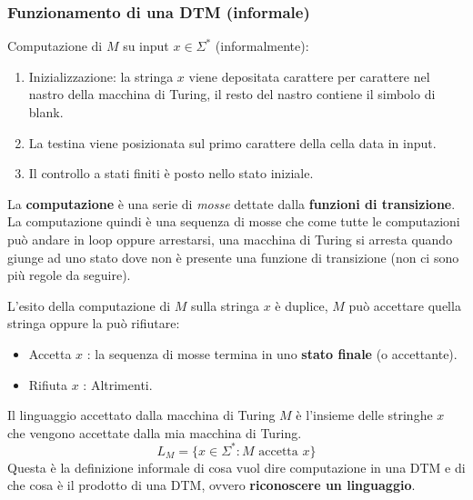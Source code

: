 \documentclass{article}
\begin{document}
\subsubsection{Funzionamento di una DTM (informale)}
Computazione di $M$ su input $x\in\Sigma^*$ (informalmente):
\begin{enumerate}
    \item Inizializzazione: la stringa $x$ viene depositata carattere per carattere nel
          nastro della macchina di Turing, il resto del nastro contiene il simbolo di blank.
    \item La testina viene posizionata sul primo carattere della cella data in input.
    \item Il controllo a stati finiti è posto nello stato iniziale.
\end{enumerate}
La \textbf{computazione} è una serie di \textit{mosse} dettate dalla \textbf{funzioni di transizione}.
La computazione quindi è una sequenza di mosse che come tutte le computazioni può andare
in loop oppure arrestarsi, una macchina di Turing si arresta quando giunge ad uno
stato dove non è presente una funzione di transizione (non ci sono più regole da seguire).

L'esito della computazione di $M$ sulla stringa $x$ è duplice, $M$ può accettare quella
stringa oppure la può rifiutare:
\begin{itemize}
    \item Accetta $x$ : la sequenza di mosse termina in uno \textbf{stato finale} (o accettante).
    \item Rifiuta $x$ : Altrimenti.
\end{itemize}
Il linguaggio accettato dalla macchina di Turing $M$ è l'insieme delle stringhe $x$ che
vengono accettate dalla mia macchina di Turing.
$$L_M=\{x\in\Sigma^*:M\text{ accetta }x\}$$
Questa è la definizione informale di cosa vuol dire computazione in una DTM e di che
cosa è il prodotto di una DTM, ovvero \textbf{riconoscere un linguaggio}.
\end{document}
